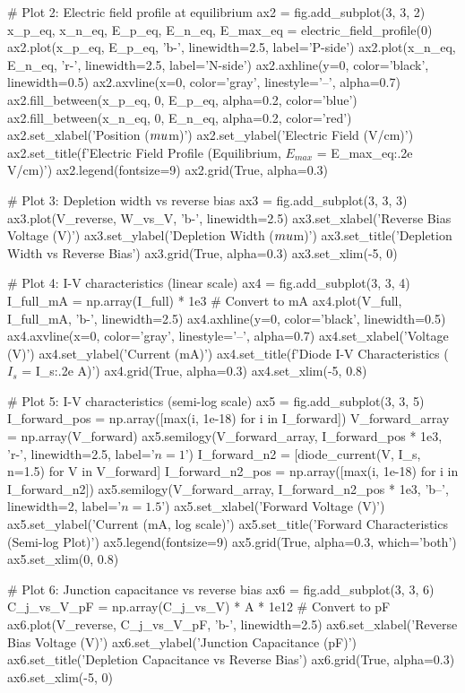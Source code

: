 \documentclass[a4paper, 11pt]{article}
\begin{document}
\begin{pycode}
# Plot 2: Electric field profile at equilibrium
ax2 = fig.add_subplot(3, 3, 2)
x_p_eq, x_n_eq, E_p_eq, E_n_eq, E_max_eq = electric_field_profile(0)
ax2.plot(x_p_eq, E_p_eq, 'b-', linewidth=2.5, label='P-side')
ax2.plot(x_n_eq, E_n_eq, 'r-', linewidth=2.5, label='N-side')
ax2.axhline(y=0, color='black', linewidth=0.5)
ax2.axvline(x=0, color='gray', linestyle='--', alpha=0.7)
ax2.fill_between(x_p_eq, 0, E_p_eq, alpha=0.2, color='blue')
ax2.fill_between(x_n_eq, 0, E_n_eq, alpha=0.2, color='red')
ax2.set_xlabel('Position ($\\mu$m)')
ax2.set_ylabel('Electric Field (V/cm)')
ax2.set_title(f'Electric Field Profile (Equilibrium, $E_{{max}}$ = {E_max_eq:.2e} V/cm)')
ax2.legend(fontsize=9)
ax2.grid(True, alpha=0.3)

# Plot 3: Depletion width vs reverse bias
ax3 = fig.add_subplot(3, 3, 3)
ax3.plot(V_reverse, W_vs_V, 'b-', linewidth=2.5)
ax3.set_xlabel('Reverse Bias Voltage (V)')
ax3.set_ylabel('Depletion Width ($\\mu$m)')
ax3.set_title('Depletion Width vs Reverse Bias')
ax3.grid(True, alpha=0.3)
ax3.set_xlim(-5, 0)

# Plot 4: I-V characteristics (linear scale)
ax4 = fig.add_subplot(3, 3, 4)
I_full_mA = np.array(I_full) * 1e3  # Convert to mA
ax4.plot(V_full, I_full_mA, 'b-', linewidth=2.5)
ax4.axhline(y=0, color='black', linewidth=0.5)
ax4.axvline(x=0, color='gray', linestyle='--', alpha=0.7)
ax4.set_xlabel('Voltage (V)')
ax4.set_ylabel('Current (mA)')
ax4.set_title(f'Diode I-V Characteristics ($I_s$ = {I_s:.2e} A)')
ax4.grid(True, alpha=0.3)
ax4.set_xlim(-5, 0.8)

# Plot 5: I-V characteristics (semi-log scale)
ax5 = fig.add_subplot(3, 3, 5)
I_forward_pos = np.array([max(i, 1e-18) for i in I_forward])
V_forward_array = np.array(V_forward)
ax5.semilogy(V_forward_array, I_forward_pos * 1e3, 'r-', linewidth=2.5, label='$n=1$')
I_forward_n2 = [diode_current(V, I_s, n=1.5) for V in V_forward]
I_forward_n2_pos = np.array([max(i, 1e-18) for i in I_forward_n2])
ax5.semilogy(V_forward_array, I_forward_n2_pos * 1e3, 'b--', linewidth=2, label='$n=1.5$')
ax5.set_xlabel('Forward Voltage (V)')
ax5.set_ylabel('Current (mA, log scale)')
ax5.set_title('Forward Characteristics (Semi-log Plot)')
ax5.legend(fontsize=9)
ax5.grid(True, alpha=0.3, which='both')
ax5.set_xlim(0, 0.8)

# Plot 6: Junction capacitance vs reverse bias
ax6 = fig.add_subplot(3, 3, 6)
C_j_vs_V_pF = np.array(C_j_vs_V) * A * 1e12  # Convert to pF
ax6.plot(V_reverse, C_j_vs_V_pF, 'b-', linewidth=2.5)
ax6.set_xlabel('Reverse Bias Voltage (V)')
ax6.set_ylabel('Junction Capacitance (pF)')
ax6.set_title('Depletion Capacitance vs Reverse Bias')
ax6.grid(True, alpha=0.3)
ax6.set_xlim(-5, 0)


\end{pycode}
\end{document}
